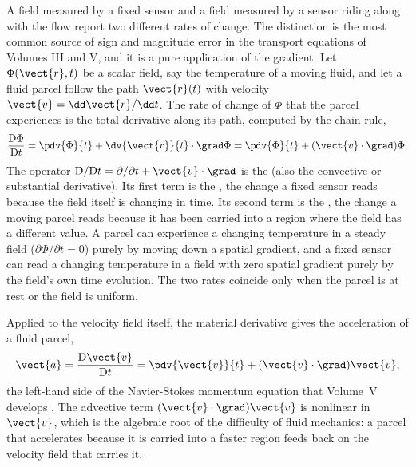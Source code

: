 A field measured by a fixed sensor and a field measured by a sensor
riding along with the flow report two different rates of change. The
distinction is the most common source of sign and magnitude error in
the transport equations of Volumes III and V, and it is a pure
application of the gradient. Let $\Phi(\vect{r}, t)$ be a scalar field,
say the temperature of a moving fluid, and let a fluid parcel follow
the path $\vect{r}(t)$ with velocity $\vect{v} = \dd\vect{r}/\dd t$.
The rate of change of $\Phi$ that the parcel experiences is the total
derivative along its path, computed by the chain rule,
\[
\frac{\mathrm{D}\Phi}{\mathrm{D}t} = \pdv{\Phi}{t} +
\dv{\vect{r}}{t}\cdot\grad\Phi = \pdv{\Phi}{t} +
(\vect{v}\cdot\grad)\Phi.
\]
The operator $\mathrm{D}/\mathrm{D}t = \partial/\partial t +
\vect{v}\cdot\grad$ is the  (also the
convective or substantial derivative). Its first term is the
, the change a fixed sensor reads because the
field itself is changing in time. Its second term is the
, the change a moving parcel reads because it
has been carried into a region where the field has a different value.
A parcel can experience a changing temperature in a steady field
($\partial\Phi/\partial t = 0$) purely by moving down a spatial
gradient, and a fixed sensor can read a changing temperature in a
field with zero spatial gradient purely by the field's own time
evolution. The two rates coincide only when the parcel is at rest or
the field is uniform.

Applied to the velocity field itself, the material derivative gives
the acceleration of a fluid parcel,
\[
\vect{a} = \frac{\mathrm{D}\vect{v}}{\mathrm{D}t} = \pdv{\vect{v}}{t}
+ (\vect{v}\cdot\grad)\vect{v},
\]
the left-hand side of the Navier-Stokes momentum equation that
Volume~V develops \cite{text:white-fluid-mechanics}. The advective
term $(\vect{v}\cdot\grad)\vect{v}$ is nonlinear in $\vect{v}$, which
is the algebraic root of the difficulty of fluid mechanics: a parcel
that accelerates because it is carried into a faster region feeds back
on the velocity field that carries it.

